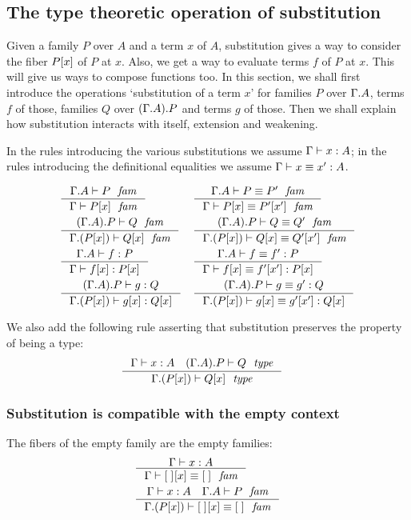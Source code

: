 \subsection{The type theoretic operation of substitution}
Given a family $P$ over $A$ and a term $x$ of $A$, substitution gives a way to
consider the fiber $\subst{x}{P}$ of $P$ at $x$. Also, we get a way to evaluate
terms $f$ of $P$ at $x$. This will give us ways to compose functions too. In
this section, we shall first introduce the operations `substitution of a term $x$'
for families $P$ over $\ctxext{\Gamma}{A}$, terms $f$ of those, families $Q$ over
$\ctxext{{\Gamma}{A}}{P}$ and terms $g$ of those. 
Then we shall explain how substitution interacts
with itself, extension and weakening.

In the rules introducing the various substitutions we assume $\jterm{\Gamma}{A}{x}$;
in the rules introducing the definitional equalities we assume $\jtermeq{\Gamma}{A}{x}{x'}$.

\begin{align}
& \inference
  {\jfam{{\Gamma}{A}}{P}}
  {\jfam{\Gamma}{\subst{x}{P}}}
& & \inference
    {\jfameq{{\Gamma}{A}}{P}{P'}}
    {\jfameq{\Gamma}{\subst{x}{P}}{\subst{x'}{P'}}}\\
& \inference
  {\jfam{{{\Gamma}{A}}{P}}{Q}}
  {\jfam{{\Gamma}{\subst{x}{P}}}{\subst{x}{Q}}}
& & \inference
    {\jfameq{{{\Gamma}{A}}{P}}{Q}{Q'}}
    {\jfameq{{\Gamma}{\subst{x}{P}}}{\subst{x}{Q}}{\subst{x'}{Q'}}}\\
& \inference
  {\jterm{{\Gamma}{A}}{P}{f}}
  {\jterm{\Gamma}{\subst{x}{P}}{\subst{x}{f}}}
& & \inference
    {\jtermeq{{\Gamma}{A}}{P}{f}{f'}}
    {\jtermeq{\Gamma}{\subst{x}{P}}{\subst{x}{f}}{\subst{x'}{f'}}}\\
& \inference
  {\jterm{{{\Gamma}{A}}{P}}{Q}{g}}
  {\jterm{{\Gamma}{\subst{x}{P}}}{\subst{x}{Q}}{\subst{x}{g}}}
& & \inference
    {\jtermeq{{{\Gamma}{A}}{P}}{Q}{g}{g'}}
    {\jtermeq{{\Gamma}{\subst{x}{P}}}{\subst{x}{Q}}{\subst{x}{g}}{\subst{x'}{g'}}}
\end{align}

We also add the following rule asserting that substitution preserves the
property of being a type:
\begin{align}
& \inference
  {\jterm{\Gamma}{A}{x}
   \jtype{\ctxext{{\Gamma}{A}}{P}}{Q}}
  {\jtype{\ctxext{\Gamma}{\subst{x}{P}}}{\subst{x}{Q}}}
\end{align}

\subsubsection{Substitution is compatible with the empty context}
The fibers of the empty family are the empty families:
\begin{align}
& \inference
  {\jterm{\Gamma}{A}{x}}
  {\jfameq{\Gamma}{\subst{x}{\emptyf}}{\emptyf}}\\
& \inference
  {\jterm{\Gamma}{A}{x}
   \jfam{{\Gamma}{A}}{P}}
  {\jfameq{{\Gamma}{\subst{x}{P}}}{\subst{x}{\emptyf}}{\emptyf}}
\end{align}

